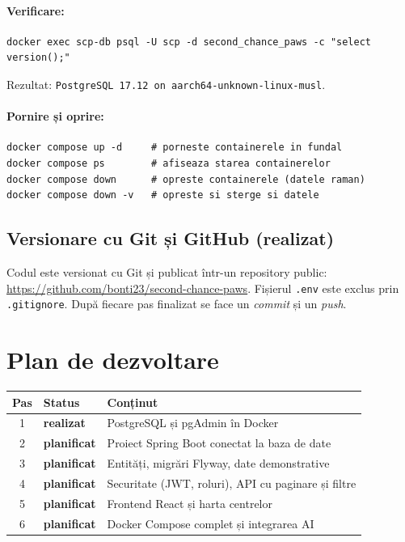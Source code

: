 \documentclass[11pt,a4paper]{article}
\newcommand{\done}{\textcolor{green!50!black}{\textbf{realizat}}}
\newcommand{\todo}{\textcolor{orange!80!black}{\textbf{planificat}}}
\begin{document}
\paragraph{Verificare:}
\begin{lstlisting}
docker exec scp-db psql -U scp -d second_chance_paws -c "select version();"
\end{lstlisting}
Rezultat: \texttt{PostgreSQL 17.12 on aarch64-unknown-linux-musl}.

\paragraph{Pornire și oprire:}
\begin{lstlisting}
docker compose up -d     # porneste containerele in fundal
docker compose ps        # afiseaza starea containerelor
docker compose down      # opreste containerele (datele raman)
docker compose down -v   # opreste si sterge si datele
\end{lstlisting}

\subsection{Versionare cu Git și GitHub (\done)}
Codul este versionat cu Git și publicat într-un repository public:
\url{https://github.com/bonti23/second-chance-paws}.
Fișierul \texttt{.env} este exclus prin \texttt{.gitignore}. După fiecare pas finalizat
se face un \emph{commit} și un \emph{push}.

\section{Plan de dezvoltare}

\begin{center}
\begin{tabularx}{\textwidth}{@{}clX@{}}
\toprule
\textbf{Pas} & \textbf{Status} & \textbf{Conținut} \\
\midrule
1 & \done & PostgreSQL și pgAdmin în Docker \\
2 & \todo & Proiect Spring Boot conectat la baza de date \\
3 & \todo & Entități, migrări Flyway, date demonstrative \\
4 & \todo & Securitate (JWT, roluri), API cu paginare și filtre \\
5 & \todo & Frontend React și harta centrelor \\
6 & \todo & Docker Compose complet și integrarea AI \\
\bottomrule
\end{tabularx}
\end{center}
\end{document}
